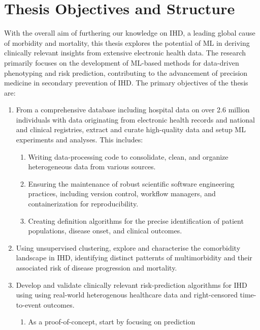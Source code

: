 \chapter{Thesis Objectives and Structure} 
\label{chap:overview}

With the overall aim of furthering our knowledge on \ac{IHD},
a leading global cause of morbidity and mortality,
this thesis explores the potential of \ac{ML} in deriving
clinically relevant insights from extensive electronic health data. 
The research primarily focuses on the development of \ac{ML}-based
methods for data-driven phenotyping and risk prediction,
contributing to the advancement of 
precision medicine in secondary prevention of \ac{IHD}. 
The primary objectives of the thesis are:

\begin{enumerate}
    \item From a comprehensive database including hospital data on
        over \num{2.6} million individuals with data 
        originating from electronic health records and
        national and clinical registries, extract and curate 
        high-quality data and setup \ac{ML} experiments and analyses.
        This includes:
    \begin{enumerate}
        \item Writing data-processing code to 
            consolidate, clean, and organize heterogeneous
            data from various sources.
        \item Ensuring the maintenance of robust scientific software 
            engineering practices, including version control, workflow
            managers, and containerization for reproducibility.
        \item Creating definition algorithms for the precise identification of 
            patient populations, disease onset, and clinical outcomes.
    \end{enumerate}
    \item Using unsupervised clustering, explore and characterise the 
        comorbidity landscape in \ac{IHD}, identifying distinct patternts
        of multimorbidity and their associated risk of disease progression
        and mortality.
    \item Develop and validate clinically relevant 
        risk-prediction algorithms for \ac{IHD} using using real-world 
        heterogenous healthcare data and right-censored time-to-event 
        outcomes.
    \begin{enumerate}
        \item As a proof-of-concept, start by focusing on prediction

\end{enumerate}
\end{enumerate}
